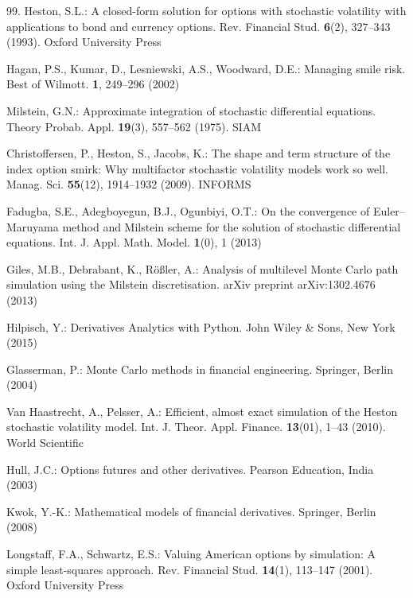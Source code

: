 \begin{thebibliography}{99.}
 Heston, S.L.: A closed-form solution for options with stochastic volatility with applications to bond and currency options. Rev. Financial Stud. \textbf{6}(2), 327--343 (1993). Oxford University Press

 Hagan, P.S., Kumar, D., Lesniewski, A.S., Woodward, D.E.: Managing smile risk. Best of Wilmott. \textbf{1}, 249--296 (2002)

 Milstein, G.N.: Approximate integration of stochastic differential equations. Theory Probab. Appl. \textbf{19}(3), 557--562 (1975). SIAM

 Christoffersen, P., Heston, S., Jacobs, K.: The shape and term structure of the index option smirk: Why multifactor stochastic volatility models work so well. Manag. Sci. \textbf{55}(12), 1914--1932 (2009). INFORMS

 Fadugba, S.E., Adegboyegun, B.J., Ogunbiyi, O.T.: On the convergence of Euler--Maruyama method and Milstein scheme for the solution of stochastic differential equations. Int. J. Appl. Math. Model. \textbf{1}(0), 1 (2013)

 Giles, M.B., Debrabant, K., Rößler, A.: Analysis of multilevel Monte Carlo path simulation using the Milstein discretisation. arXiv preprint arXiv:1302.4676 (2013)

 Hilpisch, Y.: Derivatives Analytics with Python. John Wiley \& Sons, New York (2015)

 Glasserman, P.: Monte Carlo methods in financial engineering. Springer, Berlin (2004)

 Van Haastrecht, A., Pelsser, A.: Efficient, almost exact simulation of the Heston stochastic volatility model. Int. J. Theor. Appl. Finance. \textbf{13}(01), 1--43 (2010). World Scientific

 Hull, J.C.: Options futures and other derivatives. Pearson Education, India (2003)

 Kwok, Y.-K.: Mathematical models of financial derivatives. Springer, Berlin (2008)

 Longstaff, F.A., Schwartz, E.S.: Valuing American options by simulation: A simple least-squares approach. Rev. Financial Stud. \textbf{14}(1), 113--147 (2001). Oxford University Press


\end{thebibliography}
